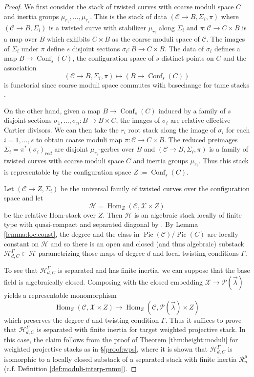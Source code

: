 \documentclass[a4paper,12pt]{amsart}
\theoremstyle{definition}
\newcommand{\cX}{\mathcal{X}}
\newcommand{\cC}{\mathcal{C}}
\newcommand{\cH}{\mathcal{H}}
\newcommand{\cR}{\mathcal{R}}
\DeclareMathOperator{\Conf}{Conf}
\newcommand{\Pcv}{\mathcal{P}(\vec{\lambda})}
\DeclareMathOperator{\Pic}{Pic}
\DeclareMathOperator{\Hom}{Hom}
\begin{document}
	\begin{proof} 
		We first consider the stack of twisted curves with coarse moduli space $C$ and inertia groups $\mu_{r_1}, \ldots, \mu_{r_s}$. This is the stack of data $(\cC \to B, \Sigma_i, \pi)$ where $(\cC \to B, \Sigma_i)$ is a twisted curve with stabilizer $\mu_{r_i}$ along $\Sigma_i$ and $\pi : \cC \to C \times B$ is a map over $B$ which exhibits $C \times B$ as the coarse moduli space of $\cC$. The images of $\Sigma_i$ under $\pi$ define $s$ disjoint sections $\sigma_i : B \to C \times B$. The data of $\sigma_i$ defines a map $B \to \Conf_s(C)$, the configuration space of $s$ distinct points on $C$ and the association 
		$$
		(\cC \to B, \Sigma_i, \pi) \mapsto (B \to \Conf_s(C))
		$$
		is functorial since coarse moduli space commutes with basechange for tame stacks \cite[Cor. 3.3]{AOV}. 
		
		On the other hand, given a map $B \to \Conf_s(C)$ induced by a family of $s$ disjoint sections $\sigma_1, \ldots, \sigma_n : B \to B \times C$, the images of $\sigma_i$ are relative effective Cartier divisors. We can then take the $r_i$ root stack along the image of $\sigma_i$ for each $i = 1, \ldots, s$ to obtain coarse moduli map $\pi : \cC \to C \times B$. The reduced preimages $\Sigma_i = \pi^*(\sigma_i)_{red}$ are disjoint $\mu_{r_i}$-gerbes over $B$ and $(\cC \to B, \Sigma_i, \pi)$ is a family of twisted curves with coarse moduli space $C$ and inertia groups $\mu_{r_i}$. Thus this stack is representable by the configuration space $Z := \Conf_s(C)$. 
		
		Let $(\cC \to Z, \Sigma_i)$ be the universal family of twisted curves over the configuration space and let 
		$$
		\cH = \Hom_{Z}(\cC, \cX \times Z)
		$$
		be the relative Hom-stack over $Z$. Then $\cH$ is an algebraic stack locally of finite type with quasi-compact and separated diagonal by \cite[Thm. C.2]{AOV}. By Lemma \ref{lemma:loc:const}, the degree and the class in $\Pic(\cC)/\Pic(C)$ are locally constant on $\cH$ and so there is an open and closed (and thus algebraic) substack $\cH^\Gamma_{d,C} \subset \cH$ parametrizing those maps of degree $d$ and local twisting conditions $\Gamma$. 
		
		To see that $\cH^\Gamma_{d,C}$ is separated and has finite inertia, we can suppose that the base field is algebraically closed. Composing with the closed embedding $\cX \to \Pcv$ yields a representable monomorphism
		$$
		\Hom_{Z}(\cC, \cX \times Z) \to \Hom_{Z}(\cC, \Pcv \times Z)
		$$
		which preserves the degree $d$ and twisting condition $\Gamma$. Thus it suffices to prove that $\cH^\Gamma_{d,C}$ is separated with finite inertia for target weighted projective stack. In this case, the claim follows from the proof of Theorem \ref{thm:height:moduli} for weighted projective stacks as in \S \ref{proof:wps}, where it is shown that $\cH^\Gamma_{d,C}$ is isomorphic to a locally closed substack of a separated stack with finite inertia $\cR^\mu_n$ (c.f. Definition \ref{def:moduli-interp-rnmu}).
		

\end{proof}
\end{document}
